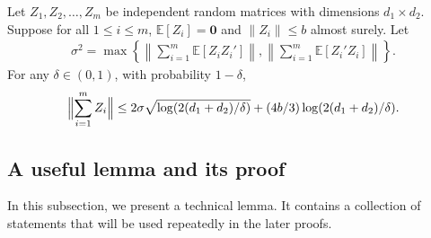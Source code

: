 \documentclass[preprint,11pt]{article}
\newcommand{\mbb}{\mathbb}
\newcommand{\mbf}{\mathbf}
\numberwithin{equation}{section}
\begin{document}
\begin{lemma} \label{lem:matrixBernstein}
Let $Z_1, Z_2, \ldots, Z_m$ be independent random matrices with dimensions $d_1\times d_2$. Suppose for all $1\le i\le m$, $\mbb{E}[Z_i]=\mbf{0}$ and $\|Z_i\|\leq b$ almost surely. Let
\begin{align*}
    \sigma^2=\max\left\{\left\|\sum_{i=1}^m\mbb{E}[Z_iZ_i']\right\|,\left\|\sum_{i=1}^m\mbb{E}[Z_i'Z_i]\right\|\right\}.
\end{align*}
For any $\delta\in (0,1)$, with probability $1-\delta$, 
\begin{align*}
\Bigl\|\sum_{i=1}^m Z_i\Bigr\|\leq 2\sigma\sqrt{\log(2(d_1+d_2)/\delta)} + (4b/3)\log(2(d_1+d_2)/\delta). 
\end{align*}
\end{lemma}
\fi

\subsection{A useful  lemma and its proof}

In this subsection, we present a technical lemma. It contains a collection of statements that will be used repeatedly in the later proofs. 
\end{document}
